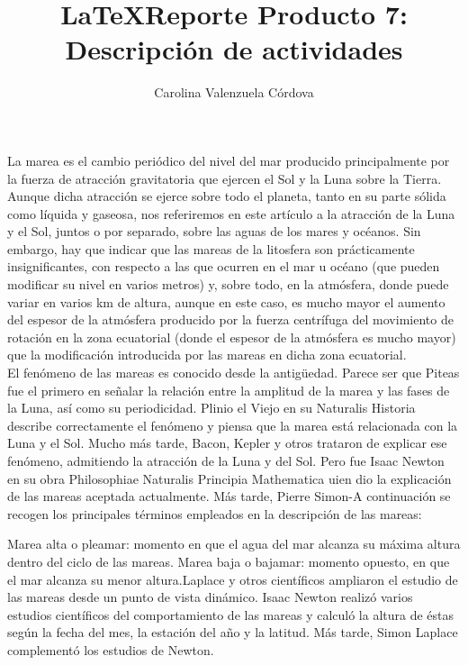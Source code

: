 \documentclass[12pt]{article}
\author{Carolina Valenzuela Córdova}
\title{\LaTeX}
\date{}
\begin{document}
\title{Reporte Producto 7: Descripción de actividades}
\maketitle{}






La marea es el cambio periódico del nivel del mar producido principalmente por la fuerza de atracción gravitatoria que ejercen el Sol y la Luna sobre la Tierra. Aunque dicha atracción se ejerce sobre todo el planeta, tanto en su parte sólida como líquida y gaseosa, nos referiremos en este artículo a la atracción de la Luna y el Sol, juntos o por separado, sobre las aguas de los mares y océanos. Sin embargo, hay que indicar que las mareas de la litosfera son prácticamente insignificantes, con respecto a las que ocurren en el mar u océano (que pueden modificar su nivel en varios metros) y, sobre todo, en la atmósfera, donde puede variar en varios km de altura, aunque en este caso, es mucho mayor el aumento del espesor de la atmósfera producido por la fuerza centrífuga del movimiento de rotación en la zona ecuatorial (donde el espesor de la atmósfera es mucho mayor) que la modificación introducida por las mareas en dicha zona ecuatorial.\\

 El fenómeno de las mareas es conocido desde la antigüedad. Parece ser que Piteas fue el primero en señalar la relación entre la amplitud de la marea y las fases de la Luna, así como su periodicidad. Plinio el Viejo en su Naturalis Historia describe correctamente el fenómeno y piensa que la marea está relacionada con la Luna y el Sol. Mucho más tarde, Bacon, Kepler y otros trataron de explicar ese fenómeno, admitiendo la atracción de la Luna y del Sol. Pero fue Isaac Newton en su obra Philosophiae Naturalis Principia Mathematica uien dio la explicación de las mareas aceptada actualmente. Más tarde, Pierre Simon-A continuación se recogen los principales términos empleados en la descripción de las mareas:

Marea alta o pleamar: momento en que el agua del mar alcanza su máxima altura dentro del ciclo de las mareas.
Marea baja o bajamar: momento opuesto, en que el mar alcanza su menor altura.Laplace y otros científicos ampliaron el estudio de las mareas desde un punto de vista dinámico.
 Isaac Newton realizó varios estudios científicos del comportamiento de las mareas y calculó la altura de éstas según la fecha del mes, la estación del año y la latitud. Más tarde, Simon Laplace complementó los estudios de Newton.\\
\end{document}
